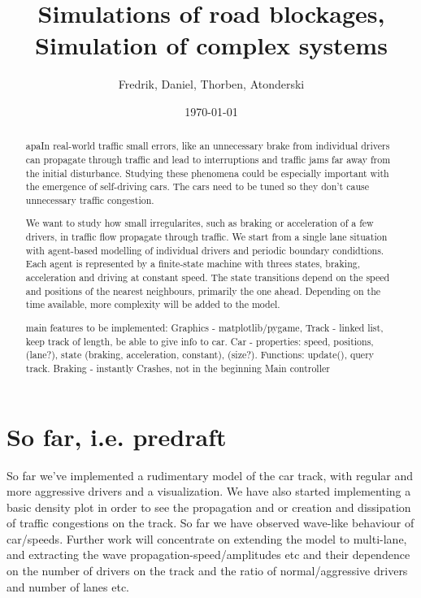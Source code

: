 \documentclass[12pt,a4paper]{article}
\begin{document}
\title{Simulations of road blockages, Simulation of complex systems}
\author{Fredrik, Daniel, Thorben, Atonderski}
\date{\today}
\maketitle

\begin{abstract}
apaIn real-world traffic small errors, like an unnecessary brake from individual drivers can propagate through traffic and lead to interruptions and traffic jams far away from the initial disturbance. Studying these phenomena could be especially important with the emergence of self-driving cars. The cars need to be tuned so they don't cause unnecessary traffic congestion.

We want to study how small irregularites, such as braking or acceleration of a few drivers, in traffic flow propagate through traffic. We start from a single lane situation with agent-based modelling of individual drivers and periodic boundary condidtions. Each agent is represented by a finite-state machine with threes states, braking, acceleration and driving at constant speed. The state transitions depend on the speed and positions of the nearest neighbours, primarily the one ahead. Depending on the time available, more complexity will be added to the model.  

main features to be implemented:
Graphics - matplotlib/pygame,
Track - linked list, keep track of length, be able to give info to car.
Car - properties: speed, positions, (lane?), state (braking, acceleration, constant), (size?). Functions: update(), query track.
Braking - instantly
Crashes, not in the beginning
Main controller


\end{abstract}

\newpage
\tableofcontents
\newpage

\section{So far, i.e. predraft}
So far we've implemented a rudimentary model of the car track, with regular and more aggressive drivers and a visualization. We have also started implementing a basic density plot in order to see the propagation and or creation and dissipation of traffic congestions on the track. So far we have observed wave-like behaviour of car/speeds. Further work will concentrate on extending the model to multi-lane, and extracting the wave propagation-speed/amplitudes etc and their dependence on the number of drivers on the track and the ratio of normal/aggressive drivers and number of lanes etc.
\end{document}
